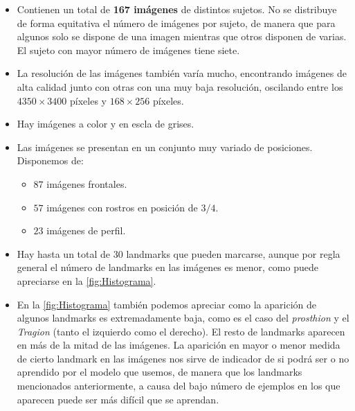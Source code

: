         \begin{itemize}
            \item Contienen un total de \textbf{167 imágenes} de distintos sujetos. No se distribuye de forma equitativa el número de imágenes por sujeto, de manera que para algunos solo se dispone de una imagen mientras que otros disponen de varias. El sujeto con mayor número de imágenes tiene siete.
            \item La resolución de las imágenes también varía mucho, encontrando imágenes de alta calidad junto con otras con una muy baja resolución, oscilando entre los $4350 \times 3400$ píxeles y $168 \times 256$ píxeles.
            \item Hay imágenes a color y en escla de grises.
            \item Las imágenes se presentan en un conjunto muy variado de posiciones. Disponemos de: 
            \begin{itemize}
                \item $87$ imágenes frontales.
                \item $57$ imágenes con rostros en posición de $3/4$.
                \item $23$ imágenes de perfil.
            \end{itemize}
            \item Hay hasta un total de $30$ landmarks que pueden marcarse, aunque por regla general el número de landmarks en las imágenes es menor, como puede apreciarse en la \autoref{fig:Histograma}.
            \item En la \autoref{fig:Histograma} también podemos apreciar como la aparición de algunos landmarks es extremadamente baja, como es el caso del \textit{prosthion} y el \textit{Tragion} (tanto el izquierdo como el derecho). El resto de landmarks aparecen en más de la mitad de las imágenes. 
            \medskip
            \noindent La aparición en mayor o menor medida de cierto landmark en las imágenes nos sirve de indicador de si podrá ser o no aprendido por el modelo que usemos, de manera que los landmarks mencionados anteriormente, a causa del bajo número de ejemplos en los que aparecen puede ser más difícil que se aprendan.
        \end{itemize}

